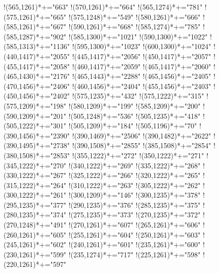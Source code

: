 \documentclass[12pt]{amsart}
\begin{document}
{ !{(565,1261)}*+{\bullet}="663" 
 !{(570,1261)}*+{\bullet}="664" 
 !{(565,1274)}*+{\bullet}="781" 
 !{(575,1261)}*+{\bullet}="665" 
 !{(575,1248)}*+{\bullet}="549" 
 !{(580,1261)}*+{\bullet}="666" 
 !{(585,1261)}*+{\bullet}="667" 
 !{(590,1261)}*+{\bullet}="668" 
 !{(585,1274)}*+{\bullet}="785" 
 !{(585,1287)}*+{\bullet}="902" 
 !{(585,1300)}*+{\bullet}="1021" 
 !{(590,1300)}*+{\bullet}="1022" 
 !{(585,1313)}*+{\bullet}="1136" 
 !{(595,1300)}*+{\bullet}="1023" 
 !{(600,1300)}*+{\bullet}="1024" 
 !{(440,1417)}*+{\bullet}="2055" 
 !{(445,1417)}*+{\bullet}="2056" 
 !{(450,1417)}*+{\bullet}="2057" 
 !{(455,1417)}*+{\bullet}="2058" 
 !{(460,1417)}*+{\bullet}="2059" 
 !{(465,1417)}*+{\bullet}="2060" 
 !{(465,1430)}*+{\bullet}="2176" 
 !{(465,1443)}*+{\bullet}="2288" 
 !{(465,1456)}*+{\bullet}="2405" 
 !{(470,1456)}*+{\bullet}="2406" 
 !{(460,1456)}*+{\bullet}="2404" 
 !{(455,1456)}*+{\bullet}="2403" 
 !{(450,1456)}*+{\bullet}="2402" 
 !{(575,1235)}*+{\bullet}="432" 
 !{(575,1222)}*+{\bullet}="315" 
 !{(575,1209)}*+{\bullet}="198" 
 !{(580,1209)}*+{\bullet}="199" 
 !{(585,1209)}*+{\bullet}="200" 
 !{(590,1209)}*+{\bullet}="201" 
 !{(505,1248)}*+{\bullet}="536" 
 !{(505,1235)}*+{\bullet}="418" 
 !{(505,1222)}*+{\bullet}="301" 
 !{(505,1209)}*+{\bullet}="184" 
 !{(505,1196)}*+{\bullet}="70" 
 !{(390,1456)}*+{\bullet}="2390" 
 !{(390,1469)}*+{\bullet}="2506" 
 !{(390,1482)}*+{\bullet}="2622" 
 !{(390,1495)}*+{\bullet}="2738" 
 !{(390,1508)}*+{\bullet}="2855" 
 !{(385,1508)}*+{\bullet}="2854" 
 !{(380,1508)}*+{\bullet}="2853" 
 !{(355,1222)}*+{\bullet}="272" 
 !{(350,1222)}*+{\bullet}="271" 
 !{(345,1222)}*+{\bullet}="270" 
 !{(340,1222)}*+{\bullet}="269" 
 !{(335,1222)}*+{\bullet}="268" 
 !{(330,1222)}*+{\bullet}="267" 
 !{(325,1222)}*+{\bullet}="266" 
 !{(320,1222)}*+{\bullet}="265" 
 !{(315,1222)}*+{\bullet}="264" 
 !{(310,1222)}*+{\bullet}="263" 
 !{(305,1222)}*+{\bullet}="262" 
 !{(300,1222)}*+{\bullet}="261" 
 !{(300,1209)}*+{\bullet}="146" 
 !{(300,1235)}*+{\bullet}="378" 
 !{(295,1235)}*+{\bullet}="377" 
 !{(290,1235)}*+{\bullet}="376" 
 !{(285,1235)}*+{\bullet}="375" 
 !{(280,1235)}*+{\bullet}="374" 
 !{(275,1235)}*+{\bullet}="373" 
 !{(270,1235)}*+{\bullet}="372" 
 !{(270,1248)}*+{\bullet}="491" 
 !{(270,1261)}*+{\bullet}="607" 
 !{(265,1261)}*+{\bullet}="606" 
 !{(260,1261)}*+{\bullet}="605" 
 !{(255,1261)}*+{\bullet}="604" 
 !{(250,1261)}*+{\bullet}="603" 
 !{(245,1261)}*+{\bullet}="602" 
 !{(240,1261)}*+{\bullet}="601" 
 !{(235,1261)}*+{\bullet}="600" 
 !{(230,1261)}*+{\bullet}="599" 
 !{(235,1274)}*+{\bullet}="717" 
 !{(225,1261)}*+{\bullet}="598" 
 !{(220,1261)}*+{\bullet}="597" 
}
\end{document}
